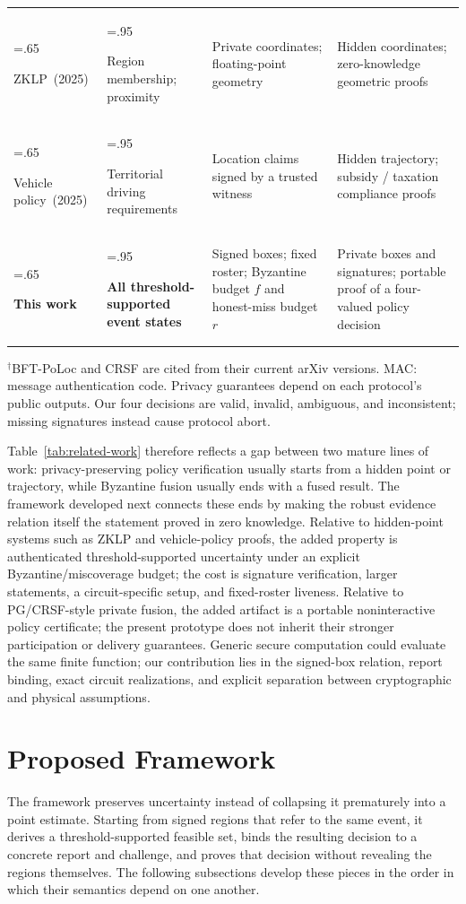 \documentclass[preprint,review,12pt]{elsarticle}
\begin{document}
\begin{table}[htbp]
\begin{tabularx}{\linewidth}{@{}>{\hsize=.65\hsize\raggedright\arraybackslash}X>{\hsize=.95\hsize\raggedright\arraybackslash}X>{\hsize=1.15\hsize\raggedright\arraybackslash}X>{\hsize=1.25\hsize\raggedright\arraybackslash}X@{}}
ZKLP~\cite{ZKLP}\newline(2025)&Region membership; proximity&Private coordinates; floating-point geometry&Hidden coordinates; zero-knowledge geometric proofs\\[2pt]
Vehicle policy~\cite{VehiclePolicy}\newline(2025)&Territorial driving requirements&Location claims signed by a trusted witness&Hidden trajectory; subsidy / taxation compliance proofs\\[2pt]
\textbf{This work}&\textbf{All threshold-supported event states}&Signed boxes; fixed roster; Byzantine budget $f$ and honest-miss budget $r$&Private boxes and signatures; portable proof of a four-valued policy decision\\
\bottomrule
\end{tabularx}
\par\vspace{4pt}\raggedright
$^{\dagger}$BFT-PoLoc and CRSF are cited from their current arXiv versions. MAC: message authentication code. Privacy guarantees depend on each protocol's public outputs. Our four decisions are valid, invalid, ambiguous, and inconsistent; missing signatures instead cause protocol abort.
\end{table}

Table~\ref{tab:related-work} therefore reflects a gap between two mature lines of work: privacy-preserving policy verification usually starts from a hidden point or trajectory, while Byzantine fusion usually ends with a fused result. The framework developed next connects these ends by making the robust evidence relation itself the statement proved in zero knowledge. Relative to hidden-point systems such as ZKLP and vehicle-policy proofs, the added property is authenticated threshold-supported uncertainty under an explicit Byzantine/miscoverage budget; the cost is signature verification, larger statements, a circuit-specific setup, and fixed-roster liveness. Relative to PG/CRSF-style private fusion, the added artifact is a portable noninteractive policy certificate; the present prototype does not inherit their stronger participation or delivery guarantees. Generic secure computation could evaluate the same finite function; our contribution lies in the signed-box relation, report binding, exact circuit realizations, and explicit separation between cryptographic and physical assumptions.
\section{Proposed Framework}
The framework preserves uncertainty instead of collapsing it prematurely into a point estimate. Starting from signed regions that refer to the same event, it derives a threshold-supported feasible set, binds the resulting decision to a concrete report and challenge, and proves that decision without revealing the regions themselves. The following subsections develop these pieces in the order in which their semantics depend on one another.
\end{document}
